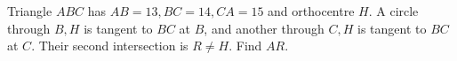 Triangle $ ABC $ has $ AB=13,BC=14,CA=15 $ and orthocentre $ H $. A circle through $ B,H $ is tangent to $ BC $ at $ B $, and another through $ C,H $ is tangent to $ BC $ at $ C $. Their second intersection is $ R\ne H $. Find $ AR $.
